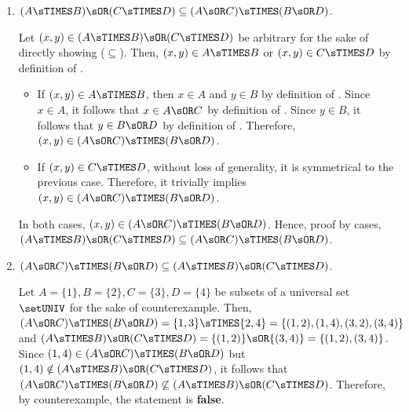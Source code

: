 \begin{enumerate}
\begin{enumerate}
    \item $(A \sTIMES B) \sOR(C \sTIMES D) \subseteq(A \sOR C) \sTIMES(B \sOR D)$.
    \begin{subprove}
      Let $(x,y) \in (A \sTIMES B) \sOR(C \sTIMES D)$ be arbitrary for the sake of directly showing ($\subseteq$). 
      Then, $(x,y) \in A \sTIMES B$ or $(x,y) \in C \sTIMES D$ by definition of . 
      \begin{itemize}
        \item If $(x,y) \in A \sTIMES B$, then $x \in A$ and $y \in B$ by definition of . \label{prob:proof-2}
        Since $x \in A$, it follows that $x \in A \sOR C$ by definition of . 
        Since $y \in B$, it follows that $y \in B \sOR D$ by definition of . 
        Therefore, $(x,y) \in (A \sOR C) \sTIMES(B \sOR D)$.
        \item If $(x,y) \in C \sTIMES D$, without loss of generality, it is symmetrical to the previous case.
        Therefore, it trivially implies $(x,y) \in (A \sOR C) \sTIMES(B \sOR D)$.
      \end{itemize}
      In both cases, $(x,y) \in (A \sOR C) \sTIMES(B \sOR D)$. 
      Hence, proof by cases, $(A \sTIMES B) \sOR(C \sTIMES D) \subseteq(A \sOR C) \sTIMES(B \sOR D)$.
    \end{subprove}

    \item $(A \sOR C) \sTIMES(B \sOR D) \subseteq(A \sTIMES B) \sOR(C \sTIMES D)$.
    \begin{subdisprove}
      Let $A=\{1\}, B=\{2\}, C=\{3\}, D=\{4\}$ be subsets of a universal set $\setUNIV$ 
      for the sake of counterexample. 
      Then, $(A \sOR C) \sTIMES(B \sOR D)=\{1,3\} \sTIMES \{2,4\}=\{(1,2),(1,4),(3,2),(3,4)\}$ 
      and $(A \sTIMES B) \sOR(C \sTIMES D)=\{(1,2)\} \sOR \{(3,4)\}=\{(1,2),(3,4)\}$. 
      Since $(1,4) \in (A \sOR C) \sTIMES(B \sOR D)$ but $(1,4) \notin (A \sTIMES B) \sOR(C \sTIMES D)$, 
      it follows that $(A \sOR C) \sTIMES(B \sOR D) \not\subseteq (A \sTIMES B) \sOR(C \sTIMES D)$. 
      Therefore, by counterexample, the statement is \textbf{false}.
    \end{subdisprove}
  \end{enumerate}






\end{enumerate}
